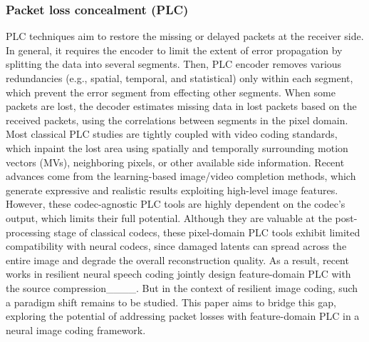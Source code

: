     \subsubsection{Packet loss concealment (PLC)}
    PLC techniques aim to restore the missing or delayed packets at the receiver side.
    In general, it requires the encoder to limit the extent of error propagation by splitting the data into several segments.
    Then, PLC encoder removes various redundancies (e.g., spatial, temporal, and statistical) only within each segment, which prevent the error segment from effecting other segments.
    When some packets are lost, the decoder estimates missing data in lost packets based on the received packets, using the correlations between segments in the pixel domain.
    Most classical PLC studies are tightly coupled with video coding standards, which inpaint the lost area using spatially and temporally surrounding motion vectors (MVs), neighboring pixels, or other available side information.
    Recent advances come from the learning-based image/video completion methods, which generate expressive and realistic results exploiting high-level image features.
    However, these codec-agnostic PLC tools are highly dependent on the codec's output, which limits their full potential.
    Although they are valuable at the post-processing stage of classical codecs, these pixel-domain PLC tools exhibit limited compatibility with neural codecs, since damaged latents can spread across the entire image and degrade the overall reconstruction quality.
    As a result, recent works in resilient neural speech coding jointly design feature-domain PLC with the source compression____.
    But in the context of resilient image coding, such a paradigm shift remains to be studied.
    This paper aims to bridge this gap, exploring the potential of addressing packet losses with feature-domain PLC in a neural image coding framework.

